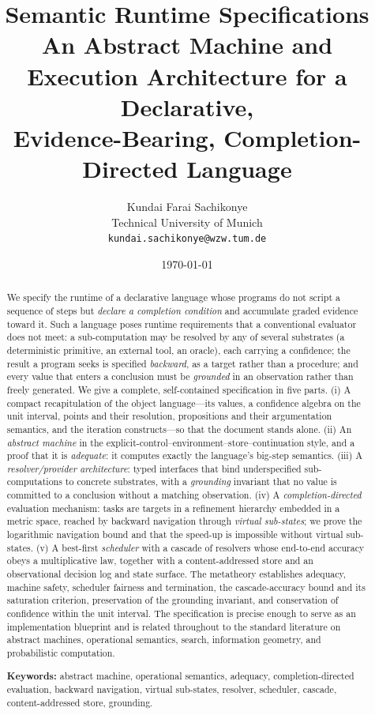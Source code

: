 \documentclass[11pt,a4paper]{article}
\title{\textbf{Semantic Runtime Specifications}\\[3pt]
\large An Abstract Machine and Execution Architecture for a Declarative,\\
Evidence-Bearing, Completion-Directed Language}
\author{Kundai Farai Sachikonye\\[2pt]
\small Technical University of Munich\\
\small \texttt{kundai.sachikonye@wzw.tum.de}}
\date{\today}
\theoremstyle{plain}
\theoremstyle{definition}
\theoremstyle{remark}
\begin{document}
\maketitle

\begin{abstract}
\noindent
We specify the runtime of a declarative language whose programs do not script a
sequence of steps but \emph{declare a completion condition} and accumulate
graded evidence toward it. Such a language poses runtime requirements that a
conventional evaluator does not meet: a sub-computation may be resolved by any
of several substrates (a deterministic primitive, an external tool, an oracle),
each carrying a confidence; the result a program seeks is specified
\emph{backward}, as a target rather than a procedure; and every value that
enters a conclusion must be \emph{grounded} in an observation rather than
freely generated. We give a complete, self-contained specification in five
parts. (i) A compact recapitulation of the object language---its values, a
confidence algebra on the unit interval, points and their resolution,
propositions and their argumentation semantics, and the iteration
constructs---so that the document stands alone. (ii) An \emph{abstract machine}
in the explicit-control--environment--store--continuation style, and a proof
that it is \emph{adequate}: it computes exactly the language's big-step
semantics. (iii) A \emph{resolver/provider architecture}: typed interfaces that
bind underspecified sub-computations to concrete substrates, with a
\emph{grounding} invariant that no value is committed to a conclusion without a
matching observation. (iv) A \emph{completion-directed} evaluation mechanism:
tasks are targets in a refinement hierarchy embedded in a metric space, reached
by backward navigation through \emph{virtual sub-states}; we prove the
logarithmic navigation bound and that the speed-up is impossible without virtual
sub-states. (v) A best-first \emph{scheduler} with a cascade of resolvers whose
end-to-end accuracy obeys a multiplicative law, together with a content-addressed
store and an observational decision log and state surface. The metatheory
establishes adequacy, machine safety, scheduler fairness and termination, the
cascade-accuracy bound and its saturation criterion, preservation of the
grounding invariant, and conservation of confidence within the unit interval.
The specification is precise enough to serve as an implementation blueprint and
is related throughout to the standard literature on abstract machines,
operational semantics, search, information geometry, and probabilistic
computation.

\medskip
\noindent\textbf{Keywords:} abstract machine, operational semantics, adequacy,
completion-directed evaluation, backward navigation, virtual sub-states,
resolver, scheduler, cascade, content-addressed store, grounding.
\end{abstract}
\end{document}
